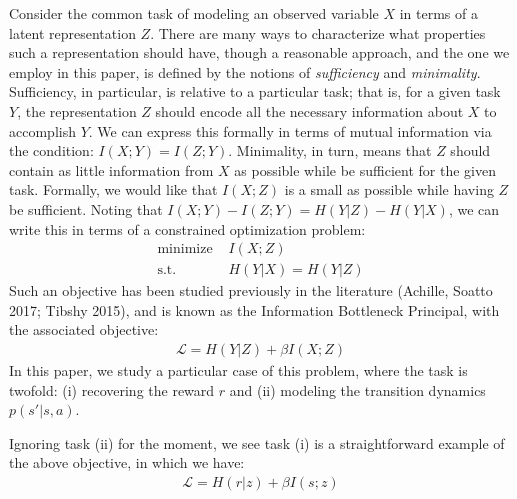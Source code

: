 \documentclass[letterpaper, 10 pt, conference]{ieeeconf}  %
\begin{document}
Consider the common task of modeling an observed variable $X$ in terms of a latent representation $Z$. There are many ways to characterize what properties such a representation should have, though a reasonable approach, and the one we employ in this paper, is defined by the notions of \textit{sufficiency} and \textit{minimality}. Sufficiency, in particular, is relative to a particular task; that is, for a given task $Y$, the representation $Z$ should encode all the necessary information about $X$ to accomplish $Y$. We can express this formally in terms of mutual information via the condition: $I(X;Y) = I(Z;Y)$. Minimality, in turn, means that $Z$ should contain as little information from $X$ as possible while be sufficient for the given task. Formally, we would like that $I(X;Z)$ is a small as possible while having $Z$ be sufficient. Noting that $I(X;Y) - I(Z;Y) = H(Y|Z) - H(Y|X)$, we can write this in terms of a constrained optimization problem:
\begin{align*}
\text{minimize  }& I(X;Z)\\
\text{s.t.  }& H(Y|X) = H(Y|Z)
\end{align*}
Such an objective has been studied previously in the literature (Achille, Soatto 2017; Tibshy 2015), and is known as the Information Bottleneck Principal, with the associated objective:
\begin{align*}
\mathcal{L} = H(Y|Z) + \beta I(X;Z)
\end{align*}
In this paper, we study a particular case of this problem, where the task is twofold: (i) recovering the reward $r$ and (ii) modeling the transition dynamics $p(s'|s,a)$.

Ignoring task (ii) for the moment, we see task (i) is a straightforward example of the above objective, in which we have:
\begin{align*}
\mathcal{L} = H(r|z) + \beta I(s;z)
\end{align*}
\end{document}
